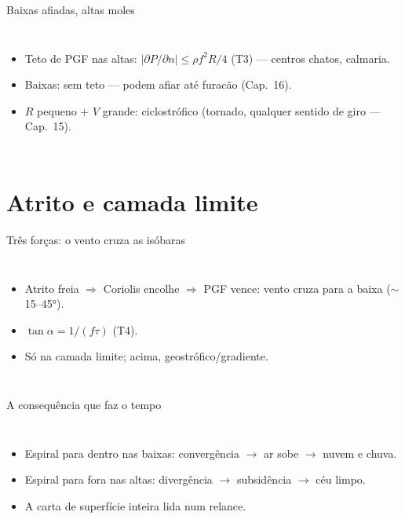 \documentclass[aspectratio=169,11pt]{beamer}
\begin{document}
\begin{frame}{Baixas afiadas, altas moles}
  \begin{columns}
    \begin{itemize}
      \item Teto de PGF nas altas:
            $|\partial P/\partial n| \le \rho f^2R/4$ (T3) — centros
            chatos, calmaria.
      \item Baixas: sem teto — podem afiar até furacão (Cap.~16).
      \item $R$ pequeno $+$ $V$ grande: \alert{ciclostrófico}
            (tornado, qualquer sentido de giro — Cap.~15).
    \end{itemize}
  \end{columns}
\end{frame}

\section{Atrito e camada limite}

\begin{frame}{Três forças: o vento cruza as isóbaras}
  \begin{columns}
    \begin{itemize}
      \item Atrito freia $\Rightarrow$ Coriolis encolhe $\Rightarrow$
            PGF vence: vento cruza \alert{para a baixa}
            ($\sim$15--45°).
      \item $\tan\alpha = 1/(f\tau)$ (T4).
      \item Só na camada limite; acima, geostrófico/gradiente.
    \end{itemize}
  \end{columns}
\end{frame}

\begin{frame}{A consequência que faz o tempo}
  \begin{columns}
    \begin{itemize}
      \item Espiral para dentro nas baixas: \alert{convergência} $\to$
            ar sobe $\to$ nuvem e chuva.
      \item Espiral para fora nas altas: \alert{divergência} $\to$
            subsidência $\to$ céu limpo.
      \item A carta de superfície inteira lida num relance.
    \end{itemize}
  \end{columns}
\end{frame}
\end{document}
